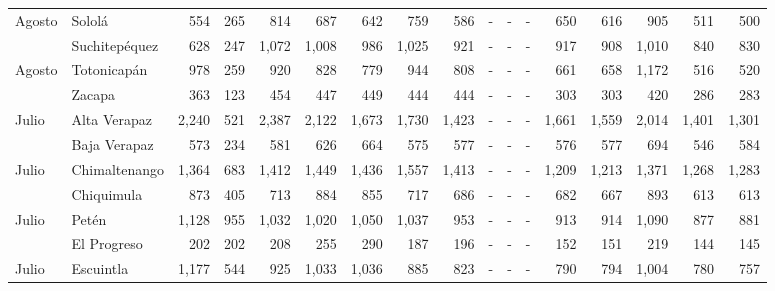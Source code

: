 \begin{landscape}
\begin{center}
\begin{longtable}{llrrrrrrrrrrrrrrr}
			\multicolumn{1}{l}{	\footnotesize	 Agosto 	}&	 Sololá 	&	 554 	&	 265 	&	 814 	&	 687 	&	 642 	&	 759 	&	 586 	&	 -   	&	 -   	&	 -   	&	 650 	&	 616 	&	 905 	&	 511 	&	 500 	\\
			\rowcolor{color1!5!white}\multicolumn{1}{l}{	\footnotesize	 Agosto 	}&	 Suchitepéquez 	&	 628 	&	 247 	&	 1,072 	&	 1,008 	&	 986 	&	 1,025 	&	 921 	&	 -   	&	 -   	&	 -   	&	 917 	&	 908 	&	 1,010 	&	 840 	&	 830 	\\
			\multicolumn{1}{l}{	\footnotesize	 Agosto 	}&	 Totonicapán 	&	 978 	&	 259 	&	 920 	&	 828 	&	 779 	&	 944 	&	 808 	&	 -   	&	 -   	&	 -   	&	 661 	&	 658 	&	 1,172 	&	 516 	&	 520 	\\
			\rowcolor{color1!5!white}\multicolumn{1}{l}{	\footnotesize	 Agosto 	}&	 Zacapa 	&	 363 	&	 123 	&	 454 	&	 447 	&	 449 	&	 444 	&	 444 	&	 -   	&	 -   	&	 -   	&	 303 	&	 303 	&	 420 	&	 286 	&	 283 	\\
			\multicolumn{1}{l}{	\footnotesize	 Julio 	}&	 Alta Verapaz 	&	 2,240 	&	 521 	&	 2,387 	&	 2,122 	&	 1,673 	&	 1,730 	&	 1,423 	&	 -   	&	 -   	&	 -   	&	 1,661 	&	 1,559 	&	 2,014 	&	 1,401 	&	 1,301 	\\
			\rowcolor{color1!5!white}\multicolumn{1}{l}{	\footnotesize	 Julio 	}&	 Baja Verapaz 	&	 573 	&	 234 	&	 581 	&	 626 	&	 664 	&	 575 	&	 577 	&	 -   	&	 -   	&	 -   	&	 576 	&	 577 	&	 694 	&	 546 	&	 584 	\\
			\multicolumn{1}{l}{	\footnotesize	 Julio 	}&	 Chimaltenango 	&	 1,364 	&	 683 	&	 1,412 	&	 1,449 	&	 1,436 	&	 1,557 	&	 1,413 	&	 -   	&	 -   	&	 -   	&	 1,209 	&	 1,213 	&	 1,371 	&	 1,268 	&	 1,283 	\\
			\rowcolor{color1!5!white}\multicolumn{1}{l}{	\footnotesize	 Julio 	}&	 Chiquimula 	&	 873 	&	 405 	&	 713 	&	 884 	&	 855 	&	 717 	&	 686 	&	 -   	&	 -   	&	 -   	&	 682 	&	 667 	&	 893 	&	 613 	&	 613 	\\
			\multicolumn{1}{l}{	\footnotesize	 Julio 	}&	 Petén 	&	 1,128 	&	 955 	&	 1,032 	&	 1,020 	&	 1,050 	&	 1,037 	&	 953 	&	 -   	&	 -   	&	 -   	&	 913 	&	 914 	&	 1,090 	&	 877 	&	 881 	\\
			\rowcolor{color1!5!white}\multicolumn{1}{l}{	\footnotesize	 Julio 	}&	 El Progreso 	&	 202 	&	 202 	&	 208 	&	 255 	&	 290 	&	 187 	&	 196 	&	 -   	&	 -   	&	 -   	&	 152 	&	 151 	&	 219 	&	 144 	&	 145 	\\
			\multicolumn{1}{l}{	\footnotesize	 Julio 	}&	 Escuintla 	&	 1,177 	&	 544 	&	 925 	&	 1,033 	&	 1,036 	&	 885 	&	 823 	&	 -   	&	 -   	&	 -   	&	 790 	&	 794 	&	 1,004 	&	 780 	&	 757 	\\

\end{longtable}
\end{center}
\end{landscape}
